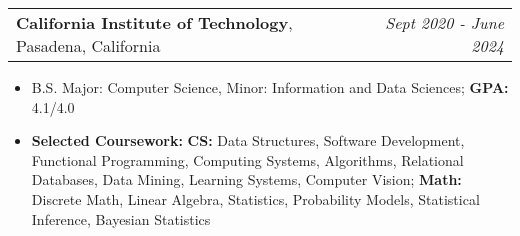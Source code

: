 \documentclass[letterpaper,11pt]{article}
\makeatletter
\newcommand{\resitem}[1]{\item[--] #1}
\newcommand{\edusubheading}[3]{
	\vspace{3pt}
	\begin{tabular*}{7.5in}{l@{\extracolsep{\fill}}r}
		\textbf{#1}, #2 & \textit{#3} \\
	\end{tabular*}
	}
\makeatother
\begin{document}

\edusubheading{California Institute of Technology}
			  {Pasadena, California}
			  {Sept 2020 - June 2024}
\begin{itemize}
	\resitem{
		B.S. Major: Computer Science,
		Minor: Information and Data Sciences;
		\textbf{GPA:} 4.1/4.0
	}
	\resitem{
		\textbf{Selected Coursework:}
			\textbf{CS:}
				Data Structures,
				Software Development,
				Functional Programming,	
				Computing Systems,
				Algorithms,
				Relational Databases,
				Data Mining,
				Learning Systems,
				Computer Vision;
			\textbf{Math:}
				Discrete Math,
				Linear Algebra,
				Statistics,
				Probability Models,
				Statistical Inference,
				Bayesian Statistics
	}
\end{itemize}

\end{document}
